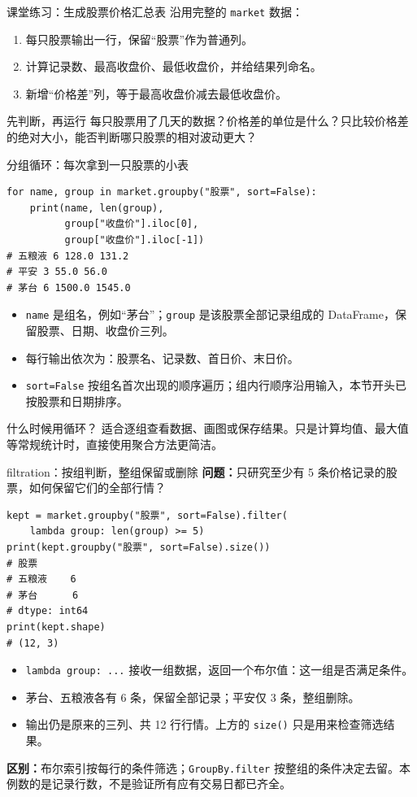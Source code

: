 \documentclass[9pt]{ctexbeamer}
\begin{document}
\begin{frame}[fragile]{课堂练习：生成股票价格汇总表}
沿用完整的 \texttt{market} 数据：
\begin{enumerate}
\item 每只股票输出一行，保留“股票”作为普通列。
\item 计算记录数、最高收盘价、最低收盘价，并给结果列命名。
\item 新增“价格差”列，等于最高收盘价减去最低收盘价。
\end{enumerate}
\begin{block}{先判断，再运行}
每只股票用了几天的数据？价格差的单位是什么？只比较价格差的绝对大小，能否判断哪只股票的相对波动更大？
\end{block}
\end{frame}


\begin{frame}[fragile]{分组循环：每次拿到一只股票的小表}
\begin{lstlisting}
for name, group in market.groupby("股票", sort=False):
    print(name, len(group),
          group["收盘价"].iloc[0],
          group["收盘价"].iloc[-1])
# 五粮液 6 128.0 131.2
# 平安 3 55.0 56.0
# 茅台 6 1500.0 1545.0
\end{lstlisting}
\begin{itemize}
\item \texttt{name} 是组名，例如“茅台”；\texttt{group} 是该股票全部记录组成的 DataFrame，保留股票、日期、收盘价三列。
\item 每行输出依次为：股票名、记录数、首日价、末日价。
\item \texttt{sort=False} 按组名首次出现的顺序遍历；组内行顺序沿用输入，本节开头已按股票和日期排序。
\end{itemize}
\begin{block}{什么时候用循环？}
适合逐组查看数据、画图或保存结果。只是计算均值、最大值等常规统计时，直接使用聚合方法更简洁。
\end{block}
\end{frame}

\begin{frame}[fragile]{filtration：按组判断，整组保留或删除}
\small \textbf{问题：}只研究至少有 5 条价格记录的股票，如何保留它们的全部行情？
\begin{lstlisting}
kept = market.groupby("股票", sort=False).filter(
    lambda group: len(group) >= 5)
print(kept.groupby("股票", sort=False).size())
# 股票
# 五粮液    6
# 茅台      6
# dtype: int64
print(kept.shape)
# (12, 3)
\end{lstlisting}
\begin{itemize}
\item \texttt{lambda group: ...} 接收一组数据，返回一个布尔值：这一组是否满足条件。
\item 茅台、五粮液各有 6 条，保留全部记录；平安仅 3 条，整组删除。
\item 输出仍是原来的三列、共 12 行行情。上方的 \texttt{size()} 只是用来检查筛选结果。
\end{itemize}
\textbf{区别：}布尔索引按每行的条件筛选；\texttt{GroupBy.filter} 按整组的条件决定去留。本例数的是记录行数，不是验证所有应有交易日都已齐全。
\end{frame}
\end{document}
